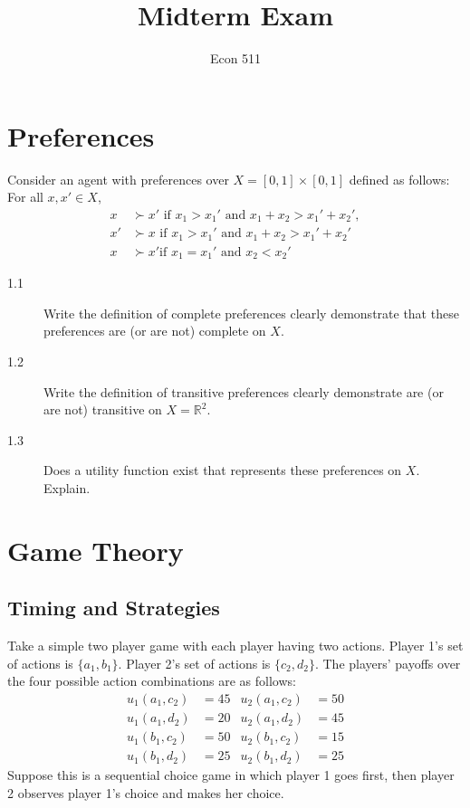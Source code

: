 \documentclass[11pt]{article}
\title{Midterm Exam}
\author{Econ 511}
\date{}
\begin{document}
\maketitle
\thispagestyle{myheadings}

\section{Preferences}

\noindent Consider an agent with preferences over $X=[0,1]\times[0,1]$ defined as follows: For all $x,x'\in X$,
\begin{align*}
x &\succ x' \text{ if } x_1 > x_1' \text{ and } x_1+x_2 > x_1'+x_2',\\
x' &\succ x \text{ if } x_1 > x_1' \text{ and } x_1+x_2 > x_1'+x_2'\\
x &\succ x' \text{if } x_1 = x_1' \text{ and } x_2 < x_2'
\end{align*}

\begin{description}
\item[1.1] Write the definition of complete preferences clearly demonstrate that these preferences are (or are not) complete on $X$.
\item[1.2] Write the definition of transitive preferences clearly demonstrate are (or are not) transitive on $X=\mathbb{R}^2$.
\item[1.3] Does a utility function exist that represents these preferences on $X$. Explain.
\end{description}

\section{Game Theory}
\subsection{Timing and Strategies}

\noindent Take a simple two player game with each player having two actions. Player 1's set of actions is $\{a_1,b_1\}$. Player 2's set of actions is $\{c_2,d_2\}$. The players' payoffs over the four possible action combinations are as follows:
\begin{align*}
u_1(a_1,c_2) &= 45 & u_2(a_1,c_2) &= 50\\
u_1(a_1,d_2) &= 20 & u_2(a_1,d_2) &= 45\\
u_1(b_1,c_2) &= 50 & u_2(b_1,c_2) &= 15\\
u_1(b_1,d_2) &= 25 & u_2(b_1,d_2) &= 25
\end{align*}
Suppose this is a sequential choice game in which player 1 goes first, then player 2 observes player 1's choice and makes her choice.
\end{document}
